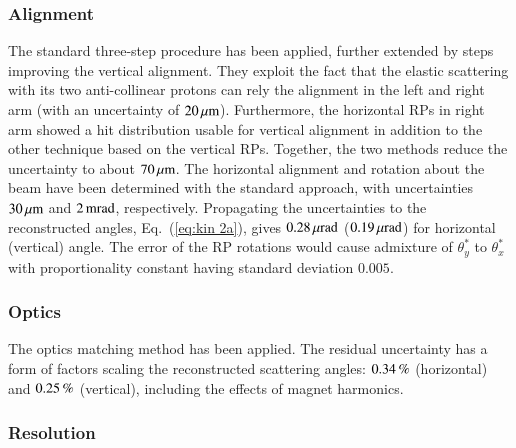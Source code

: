 \subsubsection{Alignment}

The standard three-step procedure \cite{totem-ijmp} has been applied, further extended by steps improving the vertical alignment. They exploit the fact that the elastic scattering with its two anti-collinear protons can rely the alignment in the left and right arm (with an uncertainty of $20\,{\rm \mu m}$). Furthermore, the horizontal RPs in right arm showed a hit distribution usable for vertical alignment in addition to the other technique based on the vertical RPs. Together, the two methods reduce the uncertainty to about $70\,{\rm \mu m}$. The horizontal alignment and rotation about the beam have been determined with the standard approach, with uncertainties $30\,{\rm \mu m}$ and $2\,{\rm m rad}$, respectively. Propagating the uncertainties to the reconstructed angles, Eq.~(\ref{eq:kin 2a}), gives $0.28\,{\rm \mu rad}$ ($0.19\,{\rm \mu rad}$) for horizontal (vertical) angle. The error of the RP rotations would cause admixture of $\theta_y^*$ to $\theta_x^*$ with proportionality constant having standard deviation $0.005$.



\subsubsection{Optics}

The optics matching method \cite{totem-optics} has been applied. The residual uncertainty has a form of factors scaling the reconstructed scattering angles:
$0.34\,{\rm \%}$ (horizontal) and $0.25\,{\rm \%}$ (vertical), including the effects of magnet harmonics.



\subsubsection{Resolution}

